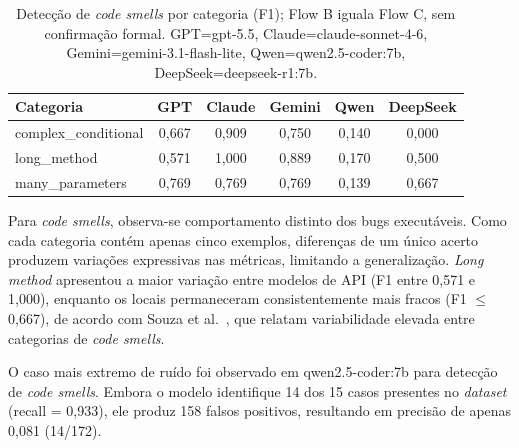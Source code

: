 \documentclass[sigconf]{acmart}
\begin{document}
\begin{table}[!t]
\caption{Detecção de \textit{code smells} por categoria (F1); Flow B iguala Flow C, sem confirmação formal. GPT=gpt-5.5, Claude=claude-sonnet-4-6, Gemini=gemini-3.1-flash-lite, Qwen=qwen2.5-coder:7b, DeepSeek=deepseek-r1:7b.}
\label{tab:smells}
\centering
\small
\setlength{\tabcolsep}{3.5pt}

\begin{tabular}{lccccc}
\toprule
Categoria & GPT & Claude & Gemini & Qwen & DeepSeek \\
\midrule
complex\_conditional & 0,667 & 0,909 & 0,750 & 0,140 & 0,000 \\
long\_method          & 0,571 & 1,000 & 0,889 & 0,170 & 0,500 \\
many\_parameters      & 0,769 & 0,769 & 0,769 & 0,139 & 0,667 \\
\bottomrule
\end{tabular}
\end{table}


Para \textit{code smells}, observa-se comportamento distinto dos bugs
executáveis. Como cada categoria contém apenas cinco exemplos, diferenças
de um único acerto produzem variações expressivas nas métricas, limitando
a generalização. \textit{Long method} apresentou a maior variação entre
modelos de API (F1 entre 0,571 e 1,000), enquanto os locais permaneceram
consistentemente mais fracos (F1 $\leq$ 0,667), de acordo com Souza et
al.~\cite{souza2026beyondstrictrules}, que relatam variabilidade elevada
entre categorias de \textit{code smells}.

O caso mais extremo de ruído foi observado em qwen2.5-coder:7b para detecção de \textit{code smells}. Embora o modelo identifique 14 dos 15 casos presentes no \textit{dataset} (recall = 0,933), ele produz 158 falsos positivos, resultando em precisão de apenas 0,081 (14/172).

\end{document}
